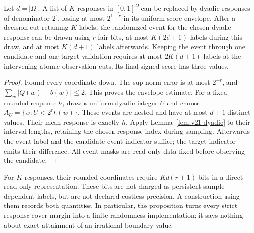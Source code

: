 \begin{proposition}\label{prop:v21-rational}
Let $d=|\Omega|$. A list of $K$ responses in $[0,1]^\Omega$ can be
replaced by dyadic responses of denominator $2^r$, losing at most
$2^{1-r}$ in its uniform score envelope. After a decision cut retaining
$K$ labels, the randomized event for the chosen dyadic response can be
drawn using $r$ fair bits, at most $K(2d+1)$ labels during this draw, and
at most $K(d+1)$ labels afterwards. Keeping the event through one
candidate and one target validation requires at most $2K(d+1)$ labels
at the intervening atomic-observation cuts. Its final signed score has
three values.
\end{proposition}
\begin{proof}
Round every coordinate down. The sup-norm error is at most $2^{-r}$,
and $\sum_w|Q(w)-b(w)|\le2$. This proves the envelope estimate.
For a fixed rounded response $h$, draw a uniform dyadic integer $U$ and
choose $A_U=\{w:U<2^rh(w)\}$. These events are nested and have at most
$d+1$ distinct values. Their mean response is exactly $h$. Apply
Lemma~\ref{lem:v21-dyadic} to their interval lengths, retaining the
chosen response index during sampling. Afterwards the event label and
the candidate-event indicator suffice; the target indicator emits their
difference. All event masks are read-only data fixed before observing
the candidate.
\end{proof}

For $K$ responses, their rounded coordinates require $Kd(r+1)$ bits in
a direct read-only representation. These bits are not charged as
persistent sample-dependent labels, but are not declared costless
precision. A construction using them records both quantities. In
particular, the proposition turns every strict response-cover margin
into a finite-randomness implementation; it says nothing about exact
attainment of an irrational boundary value.
